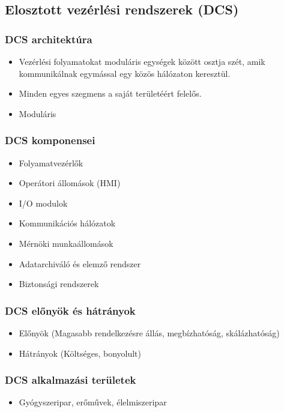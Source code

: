 \subsection{Elosztott vezérlési rendszerek (DCS)}
\subsubsection{DCS architektúra}
\begin{itemize}
    \item Vezérlési folyamatokat moduláris egységek között osztja szét, amik kommunikálnak egymással egy közös hálózaton keresztül.
    \item Minden egyes szegmens a saját területéért felelős.
    \item Moduláris
\end{itemize}

\subsubsection{DCS komponensei}
\begin{itemize}
    \item Folyamatvezérlők
    \item Operátori állomások (HMI)
    \item I/O modulok
    \item Kommunikációs hálózatok
    \item Mérnöki munkaállomások
    \item Adatarchiváló és elemző rendszer
    \item Biztonsági rendszerek
\end{itemize}

\subsubsection{DCS előnyök és hátrányok}
\begin{itemize}
    \item Előnyök (Magasabb rendelkezésre állás, megbízhatóság, skálázhatóság)
    \item Hátrányok (Költséges, bonyolult)
\end{itemize}

\subsubsection{DCS alkalmazási területek}
\begin{itemize}
    \item Gyógyszeripar, erőművek, élelmiszeripar
\end{itemize}

